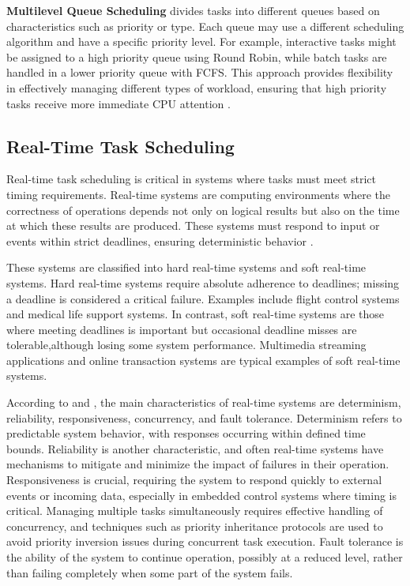 \textbf{Multilevel Queue Scheduling} divides tasks into different queues based on characteristics such as priority or type. Each queue may use a different scheduling algorithm and have a specific priority level. For example, interactive tasks might be assigned to a high priority queue using Round Robin, while batch tasks are handled in a lower priority queue with FCFS. This approach provides flexibility in effectively managing different types of workload, ensuring that high priority tasks receive more immediate CPU attention \cite{silberschatz2018,tanenbaum2015}.


\subsection{Real-Time Task Scheduling}

Real-time task scheduling is critical in systems where tasks must meet strict timing requirements. Real-time systems are computing environments where the correctness of operations depends not only on logical results but also on the time at which these results are produced. These systems must respond to input or events within strict deadlines, ensuring deterministic behavior \cite{Burns2009}.

These systems are classified into hard real-time systems and soft real-time systems. Hard real-time systems require absolute adherence to deadlines; missing a deadline is considered a critical failure. Examples include flight control systems and medical life support systems. In contrast, soft real-time systems are those where meeting deadlines is important but occasional deadline misses are tolerable,although losing some system performance. Multimedia streaming applications and online transaction systems are typical examples of soft real-time systems. \cite{Buttazzo2020}

According to \cite{tanenbaum2015} and \cite{pandit2013}, the main characteristics of real-time systems are determinism, reliability, responsiveness, concurrency, and fault tolerance. Determinism refers to predictable system behavior, with responses occurring within defined time bounds. Reliability is another characteristic, and often real-time systems have mechanisms to mitigate and minimize the impact of failures in their operation. Responsiveness is crucial, requiring the system to respond quickly to external events or incoming data, especially in embedded control systems where timing is critical. Managing multiple tasks simultaneously requires effective handling of concurrency, and techniques such as priority inheritance protocols are used to avoid priority inversion issues during concurrent task execution. Fault tolerance is the ability of the system to continue operation, possibly at a reduced level, rather than failing completely when some part of the system fails.


